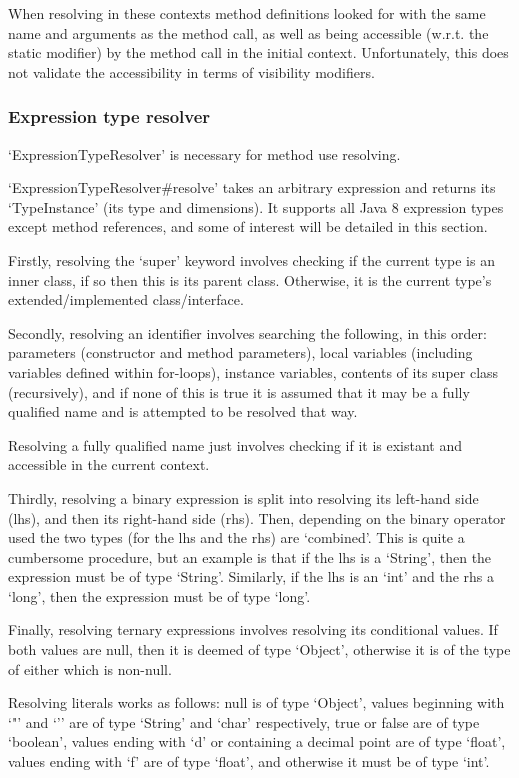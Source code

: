 \documentclass[12pt, letterpaper]{article}
\begin{document}
When resolving in these contexts method definitions looked for with the same name and arguments as the method call, as well as being accessible (w.r.t. the static modifier) by the method call in the initial context.
Unfortunately, this does not validate the accessibility in terms of visibility modifiers.

\subsubsection{Expression type resolver}
`ExpressionTypeResolver' is necessary for method use resolving.

`ExpressionTypeResolver\#resolve' takes an arbitrary expression and returns its `TypeInstance' (its type and dimensions).
It supports all Java 8 expression types except method references, and some of interest will be detailed in this section.

Firstly, resolving the `super' keyword involves checking if the current type is an inner class, if so then this is its parent class.
Otherwise, it is the current type's extended/implemented class/interface.

Secondly, resolving an identifier involves searching the following, in this order: parameters (constructor and method parameters), local variables (including variables defined within for-loops), instance variables, contents of its super class (recursively), and if none of this is true it is assumed that it may be a fully qualified name and is attempted to be resolved that way.

Resolving a fully qualified name just involves checking if it is existant and accessible in the current context.

Thirdly, resolving a binary expression is split into resolving its left-hand side (lhs), and then its right-hand side (rhs).
Then, depending on the binary operator used the two types (for the lhs and the rhs) are `combined'.
This is quite a cumbersome procedure, but an example is that if the lhs is a `String', then the expression must be of type `String'.
Similarly, if the lhs is an `int' and the rhs a `long', then the expression must be of type `long'.

Finally, resolving ternary expressions involves resolving its conditional values.
If both values are null, then it is deemed of type `Object', otherwise it is of the type of either which is non-null.

Resolving literals works as follows: null is of type `Object', values beginning with `"' and `'' are of type `String' and `char' respectively, true or false are of type `boolean', values ending with `d' or containing a decimal point are of type `float', values ending with `f' are of type `float', and otherwise it must be of type `int'.
\end{document}
